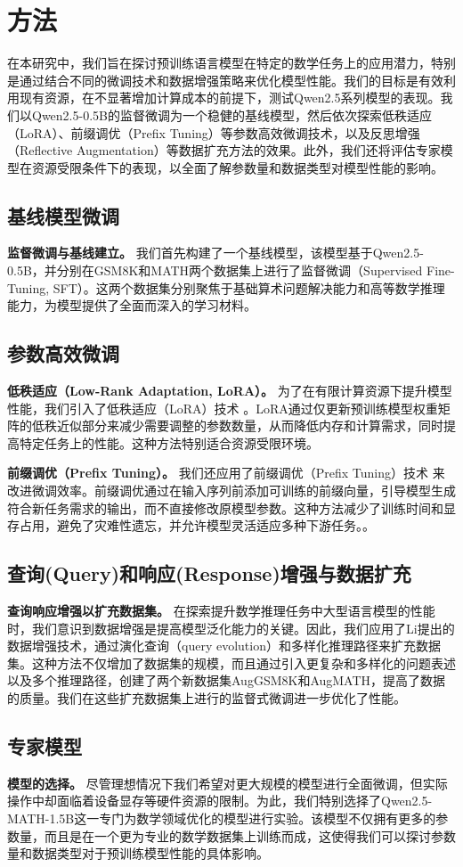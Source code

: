 \section{方法}
\label{sec:methodology}
在本研究中，我们旨在探讨预训练语言模型在特定的数学任务上的应用潜力，特别是通过结合不同的微调技术和数据增强策略来优化模型性能。我们的目标是有效利用现有资源，在不显著增加计算成本的前提下，测试Qwen2.5系列模型\citep{qwen2.5}的表现。我们以Qwen2.5-0.5B的监督微调为一个稳健的基线模型，然后依次探索低秩适应（LoRA）、前缀调优（Prefix Tuning）等参数高效微调技术，以及反思增强（Reflective Augmentation）等数据扩充方法的效果。此外，我们还将评估专家模型在资源受限条件下的表现，以全面了解参数量和数据类型对模型性能的影响。
\subsection{基线模型微调}
\textbf{监督微调与基线建立。} 我们首先构建了一个基线模型，该模型基于Qwen2.5-0.5B，并分别在GSM8K\citep{cobbe2021training}和MATH\citep{hendrycksmath2021}两个数据集上进行了监督微调（Supervised Fine-Tuning, SFT）。这两个数据集分别聚焦于基础算术问题解决能力和高等数学推理能力，为模型提供了全面而深入的学习材料。

\subsection{参数高效微调}
\textbf{低秩适应（Low-Rank Adaptation, LoRA）。} 为了在有限计算资源下提升模型性能，我们引入了低秩适应（LoRA）技术 \citep{hu2022lora}。LoRA通过仅更新预训练模型权重矩阵的低秩近似部分来减少需要调整的参数数量，从而降低内存和计算需求，同时提高特定任务上的性能。这种方法特别适合资源受限环境。

\textbf{前缀调优（Prefix Tuning）。} 我们还应用了前缀调优（Prefix Tuning）技术 \citep{li2021prefixtuning} 来改进微调效率。前缀调优通过在输入序列前添加可训练的前缀向量，引导模型生成符合新任务需求的输出，而不直接修改原模型参数。这种方法减少了训练时间和显存占用，避免了灾难性遗忘，并允许模型灵活适应多种下游任务。。

\subsection{查询(Query)和响应(Response)增强与数据扩充}
\textbf{查询响应增强以扩充数据集。} 在探索提升数学推理任务中大型语言模型的性能时，我们意识到数据增强是提高模型泛化能力的关键。因此，我们应用了Li\citep{li2023query}提出的数据增强技术，通过演化查询（query evolution）和多样化推理路径来扩充数据集。这种方法不仅增加了数据集的规模，而且通过引入更复杂和多样化的问题表述以及多个推理路径，创建了两个新数据集AugGSM8K和AugMATH，提高了数据的质量。我们在这些扩充数据集上进行的监督式微调进一步优化了性能。

\subsection{专家模型}
\textbf{模型的选择。} 尽管理想情况下我们希望对更大规模的模型进行全面微调，但实际操作中却面临着设备显存等硬件资源的限制。为此，我们特别选择了Qwen2.5-MATH-1.5B这一专门为数学领域优化的模型进行实验。该模型不仅拥有更多的参数量，而且是在一个更为专业的数学数据集上训练而成，这使得我们可以探讨参数量和数据类型对于预训练模型性能的具体影响。